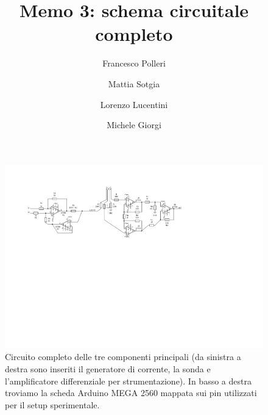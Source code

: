 \documentclass[fleqn,varvw,preprintnumbers,citeautoscript]{memo}
\begin{document}
\title{Memo 3: schema circuitale completo}

\author{Francesco Polleri}
\author{Mattia Sotgia}


\author{Lorenzo Lucentini}
\author{Michele Giorgi}

\revised{\today}

\begin{abstract}

\end{abstract}
\maketitle

\begin{turnpage}
    \begin{figure}[p]
        \centering
        \includegraphics[width=\linewidth,trim={2.5cm 3.5cm 2cm 2cm},clip]{SCHEMA_full1.pdf}
        \caption{Circuito completo delle tre componenti principali (da sinistra a destra sono inseriti il generatore di corrente, la sonda e l'amplificatore differenziale per strumentazione). In basso a destra troviamo la scheda Arduino MEGA 2560 mappata sui pin utilizzati per il setup sperimentale. }\label{fig:circuit_memo2}
    \end{figure}
\end{turnpage}
\end{document}
